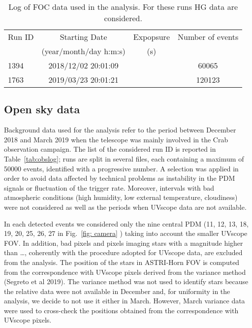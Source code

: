 \begin{table*}[htbp!!]
\centering
\caption{Log of FOC data used in the analysis. For these runs HG data are considered. }
\label{tab:FOC}
\begin{tabular}{lccc}
\hline\hline
Run ID & Starting Date &  Expopsure & Number of events \\
               & (year/month/day h:m:s) & (s)   \\
\hline     
1394 & 2018/12/02 20:01:09  &  & 60065     \\
1763 & 2019/03/23 20:01:21  &  & 120123    \\ 
\hline\hline
\end{tabular}
\end{table*}

\subsection{Open sky data} 
\label{subs:skydata}

Background data used for the analysis refer to the period between December 2018 and March 2019 when the telescope was mainly involved in the Crab observation campaign. The list of the considered run ID is reported in Table~\ref{tab:obslog}; runs are split in several files, each containing a maximum of 50000 events, identified with a progressive number.
A selection was applied in order to avoid data affected by technical problems as instability in the PDM signals or fluctuation of the trigger rate. Moreover, intervals with bad atmospheric conditions 
(high humidity, low external temperature, cloudiness) were not considered as well as the periods when UVscope data are not available.

In each detected events we considered only the nine central PDM (11, 12, 13, 18, 19, 20, 25, 26, 27 in Fig.~\ref{fig: camera} ) taking into account the smaller UVscope FOV.  In addition, bad pixels and pixels imaging stars with a magnitude higher than …, coherently with the procedure adopted for UVscope data, are excluded from the analysis. The position of the stars in ASTRI-Horn FOV is computed from the correspondence with UVscope pixels derived from the variance method (Segreto et al 2019). 
The variance method was not used to identify stars because the relative data were not available in December and, for uniformity in the analysis, we decide to not use it either in March.  However, March variance data were used to cross-check the positions obtained from the correspondence with UVscope pixels.


